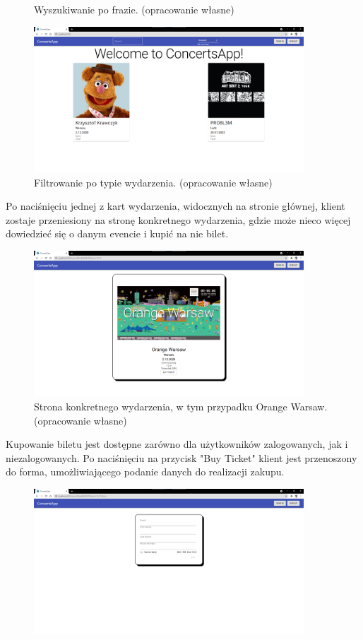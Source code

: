 \documentclass[12pt]{article}
\begin{document}
\begin{sloppypar}
{\begin{figure}[H]
    \caption{Wyszukiwanie po frazie. (opracowanie własne)}
    \label{fig:search-field}
  \end{figure}
  \begin{figure}[H]
    \centering
    \includegraphics[width=0.9\textwidth]{client_app/filter.png}
    \caption{Filtrowanie po typie wydarzenia. (opracowanie własne)}
    \label{fig:filter}
  \end{figure}
  Po naciśnięciu jednej z kart wydarzenia, widocznych na stronie głównej, klient zostaje przeniesiony na stronę konkretnego wydarzenia, 
  gdzie może nieco więcej dowiedzieć się o danym evencie i kupić na nie bilet.
  \begin{figure}[H]
    \centering
    \includegraphics[width=0.9\textwidth]{client_app/event.png}
    \caption{Strona konkretnego wydarzenia, w tym przypadku Orange Warsaw. (opracowanie własne)}
    \label{fig:event-page}
  \end{figure} 
  Kupowanie biletu jest dostępne zarówno dla użytkowników zalogowanych, jak i niezalogowanych. 
  Po naciśnięciu na przycisk "Buy Ticket" klient jest przenoszony do forma, umożliwiającego podanie danych do realizacji zakupu.
  \begin{figure}[H]
    \centering
    \includegraphics[width=0.9\textwidth]{client_app/payment_guest.png}

\end{figure}}
\end{sloppypar}
\end{document}
